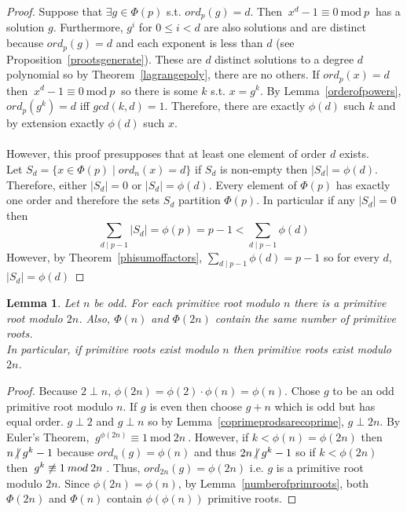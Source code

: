 \documentclass[12pt]{extarticle}
\renewcommand\qedsymbol{$\square$}
\newcommand{\divides}{\mid}
\newcommand{\ndivides}{\centernot \mid}
\newtheorem{lemma}[theorem]{Lemma}
\newenvironment{lproof}{\begin{proof} \renewcommand{\qedsymbol}{}}{\end{proof}}
\renewcommand{\mod}[3]{\: #1 \equiv #2 \: \mathrm{mod} \: #3 \:}
\newcommand{\nmod}[3]{\: #1 \centernot \equiv #2 \: mod \: #3 \:}
\begin{document}
\begin{proof}
Suppose that $\exists g \in \Phi (p)$ s.t. $ord_p (g) = d$. Then $\mod{x^d - 1}{0}{p}$ has a solution $g$. Furthermore, $g^i$ for $0 \le i < d$ are also solutions and are distinct because $ord_p(g) = d$ and each exponent is less than $d$ (see Proposition~\ref{prootsgenerate}). These are $d$ distinct solutions to a degree $d$ polynomial so by Theorem~\ref{lagrangepoly}, there are no others. If $ord_p (x) = d$ then $\mod{x^d - 1}{0}{p}$ so there is some $k$ s.t. $x = g^k$. By Lemma~\ref{orderofpowers}, $ord_p(g^k) =d $ iff $gcd(k,d) = 1$. Therefore, there are exactly $\phi (d)$ such $k$ and by extension exactly $\phi (d)$ such $x$.
\\\\
However, this proof presupposes that at least one element of order $d$ exists. \\
Let $S_d = \{x \in \Phi (p) \mid ord_n(x) = d\}$ if $S_d$ is non-empty then $|S_d| = \phi (d)$. \\ Therefore, either $|S_d| = 0$ or $|S_d| = \phi (d)$. Every element of $\Phi (p)$ has exactly one order and therefore the sets $S_d$ partition $\Phi (p)$. In particular if any $|S_d| = 0$ then \[\sum \limits_{d \divides p-1} |S_d| = \phi (p) = p -1 < \sum \limits_{d \divides p-1} \phi (d)\] However, by Theorem~\ref{phisumoffactors}, $\sum \limits_{d \divides p-1} \phi (d) = p-1$ so for every $d$, $|S_d| = \phi (d)$
\end{proof}

\begin{lemma}
\label{primrootsofdouble}
Let $n$ be odd. For each primitive root modulo $n$ there is a primitive root modulo $2n$. Also, $\Phi(n)$ and $\Phi(2n)$ contain the same number of primitive roots.\\
In particular, if primitive roots exist modulo $n$ then primitive roots exist modulo $2n$. 
\end{lemma}

\begin{lproof}
Because $2 \perp n$, $\phi(2n) = \phi (2) \cdot \phi (n) = \phi (n)$. Chose $g$ to be an odd primitive root modulo $n$. If $g$ is even then choose $g + n$ which is odd but has equal order. $g \perp 2$ and $g \perp n$ so by Lemma~\ref{coprimeprodsarecoprime}, $g \perp 2n$. By Euler's Theorem, $\mod{g^{\phi (2n)}}{1}{2n}$. However, if $k < \phi(n) = \phi (2n)$ then $n \ndivides g^k - 1$ because $ord_n(g) = \phi (n)$ and thus $2n \ndivides g^k - 1$ so if $k < \phi(2n)$ then $\nmod{g^k}{1}{2n}$. Thus, $ord_{2n}(g) = \phi (2n)$ i.e. $g$ is a primitive root modulo $2n$. Since $\phi(2n) = \phi (n)$, by Lemma~\ref{numberofprimroots}, both $\Phi(2n)$ and $\Phi(n)$ contain $\phi (\phi(n))$ primitive roots.   
\end{lproof}
\end{document}

